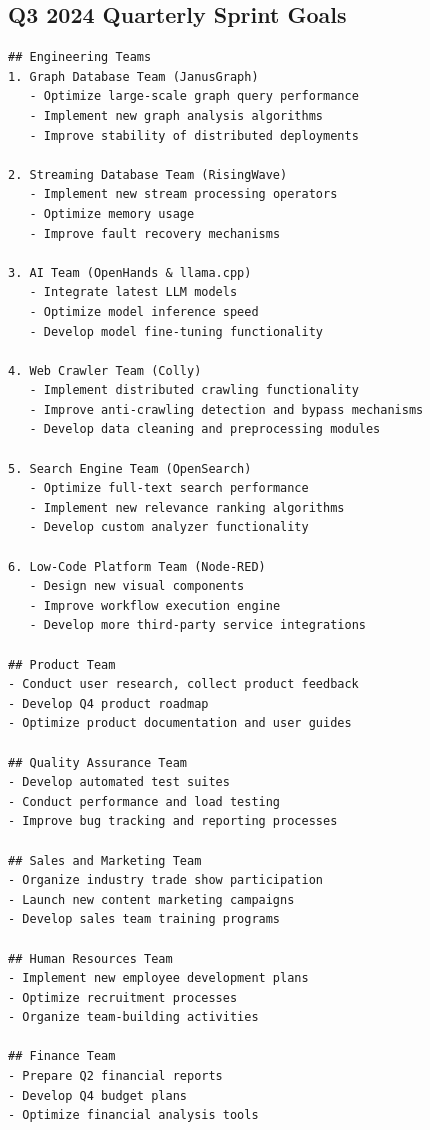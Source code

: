 \subsection{\tac Q3 2024 Quarterly Sprint Goals}
\begin{lstlisting}
## Engineering Teams
1. Graph Database Team (JanusGraph)
   - Optimize large-scale graph query performance
   - Implement new graph analysis algorithms
   - Improve stability of distributed deployments

2. Streaming Database Team (RisingWave)
   - Implement new stream processing operators
   - Optimize memory usage
   - Improve fault recovery mechanisms

3. AI Team (OpenHands & llama.cpp)
   - Integrate latest LLM models
   - Optimize model inference speed
   - Develop model fine-tuning functionality

4. Web Crawler Team (Colly)
   - Implement distributed crawling functionality
   - Improve anti-crawling detection and bypass mechanisms
   - Develop data cleaning and preprocessing modules

5. Search Engine Team (OpenSearch)
   - Optimize full-text search performance
   - Implement new relevance ranking algorithms
   - Develop custom analyzer functionality

6. Low-Code Platform Team (Node-RED)
   - Design new visual components
   - Improve workflow execution engine
   - Develop more third-party service integrations

## Product Team
- Conduct user research, collect product feedback
- Develop Q4 product roadmap
- Optimize product documentation and user guides

## Quality Assurance Team
- Develop automated test suites
- Conduct performance and load testing
- Improve bug tracking and reporting processes

## Sales and Marketing Team
- Organize industry trade show participation
- Launch new content marketing campaigns
- Develop sales team training programs

## Human Resources Team
- Implement new employee development plans
- Optimize recruitment processes
- Organize team-building activities

## Finance Team
- Prepare Q2 financial reports
- Develop Q4 budget plans
- Optimize financial analysis tools
\end{lstlisting}

